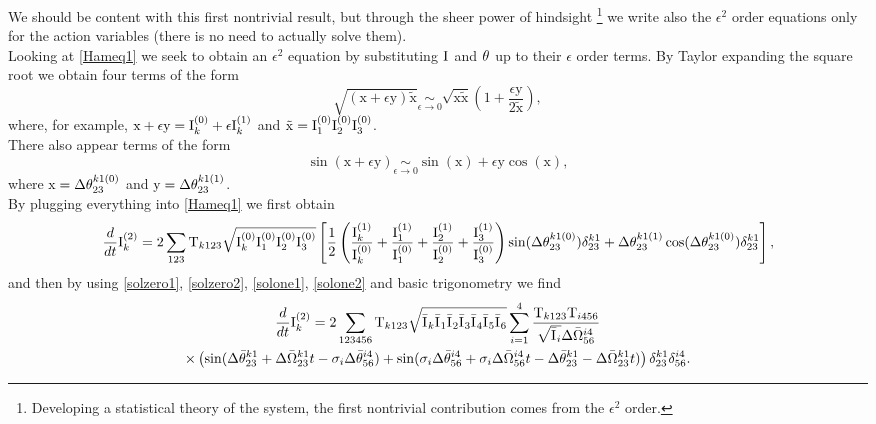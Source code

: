 We should be content with this first nontrivial result, but through the sheer power of hindsight
\footnote{Developing a statistical theory of the system, the first nontrivial contribution comes from the $\epsilon^2$ order.}
we write also the 
$\epsilon^2$ order equations only for the action variables (there is no need to actually solve them). \\
Looking at \eqref{Hameq1} we seek to obtain an $\epsilon^2$ equation by substituting $\mathrm{I}^{}$ and $\theta^{}$ up to their $\epsilon$ order terms. By Taylor expanding the square root 
we obtain four terms of the form
\begin{equation}
    \sqrt{(\mathrm{x} +\epsilon \mathrm{y})\mathrm{\tilde{x}}} \underset{\epsilon \rightarrow 0}{\sim} 
    \sqrt{\mathrm{x}\mathrm{\tilde{x}}}\left( 1 + \frac{\epsilon \mathrm{y}}{2\mathrm{\tilde{x}}}\right),
\end{equation}
where, for example, $\mathrm{x} + \epsilon \mathrm{y} = \mathrm{I}^{(0)}_k + \epsilon \mathrm{I}^{(1)}_k$ and $\mathrm{\tilde{x}} = \mathrm{I}^{(0)}_1\mathrm{I}^{(0)}_2\mathrm{I}^{(0)}_3$.\\
There also appear terms of the form
\begin{equation}
    \sin(\mathrm{x} + \epsilon \mathrm{y}) \underset{\epsilon \rightarrow 0}{\sim} \sin(\mathrm{x}) + \epsilon \mathrm{y} \cos(\mathrm{x}),
\end{equation} 
where $\mathrm{x} = \Delta\theta^{k1(0)}_{23}$ and $\mathrm{y} = \Delta\theta^{k1(1)}_{23}$.\\
By plugging everything into \eqref{Hameq1} we first obtain
\begin{equation}
    \frac{d}{dt} \mathrm{I}^{(2)}_k = 2 \sum_{123} \mathrm{T}_{k123} \sqrt{\mathrm{I}^{(0)}_k\mathrm{I}^{(0)}_1\mathrm{I}^{(0)}_2\mathrm{I}^{(0)}_3} \left[ \frac{1}{2}\left(\frac{\mathrm{I}^{(1)}_k}{\mathrm{I}^{(0)}_k}+\frac{\mathrm{I}^{(1)}_1}{\mathrm{I}^{(0)}_1}+
    \frac{\mathrm{I}^{(1)}_2}{\mathrm{I}^{(0)}_2}+\frac{\mathrm{I}^{(1)}_3}{\mathrm{I}^{(0)}_3} \right)\sin(\Delta\theta^{k1(0)}_{23})\delta^{k1}_{23} + 
    \Delta\theta^{k1(1)}_{23}\cos(\Delta\theta^{k1(0)}_{23}) \delta^{k1}_{23}\right],
\end{equation}
and then by using \eqref{solzero1}, \eqref{solzero2}, \eqref{solone1}, \eqref{solone2} and basic trigonometry we find
\begin{multline}
    \frac{d}{dt} \mathrm{I}^{(2)}_k = 2 \sum_{123456}\mathrm{T}_{k123} \sqrt{\bar{\mathrm{I}^{}}_k\bar{\mathrm{I}^{}}_1\bar{\mathrm{I}^{}}_2\bar{\mathrm{I}^{}}_3\bar{\mathrm{I}^{}}_4\bar{\mathrm{I}^{}}_5\bar{\mathrm{I}^{}}_6} 
    \sum_{i=1}^{4}\frac{\mathrm{T}_{k123}\mathrm{T}_{i456}}{\sqrt{\bar{\mathrm{I}^{}}_i}\Delta\bar{\Omega}^{i4}_{56}} \\
    \times\left(\sin(\Delta\bar{\theta}^{k1}_{23} + \Delta\bar{\Omega}^{k1}_{23}t - \sigma_i \Delta\bar{\theta}^{i4}_{56}) 
    + \sin(\sigma_i \Delta\bar{\theta}^{i4}_{56} + \sigma_i\Delta\bar{\Omega}^{i4}_{56}t -\Delta\bar{\theta}^{k1}_{23} - \Delta\bar{\Omega}^{k1}_{23}t)  \right)\delta^{k1}_{23}\delta^{i4}_{56}. 
    \label{eqeps2}
\end{multline}

